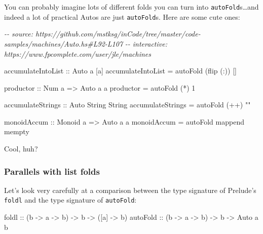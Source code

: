 \documentclass[]{article}
\newenvironment{Shaded}{}{}
\newcommand{\CommentTok}[1]{\textcolor[rgb]{0.38,0.63,0.69}{\textit{#1}}}
\newcommand{\DataTypeTok}[1]{\textcolor[rgb]{0.56,0.13,0.00}{#1}}
\newcommand{\DecValTok}[1]{\textcolor[rgb]{0.25,0.63,0.44}{#1}}
\newcommand{\FunctionTok}[1]{\textcolor[rgb]{0.02,0.16,0.49}{#1}}
\newcommand{\NormalTok}[1]{#1}
\newcommand{\OperatorTok}[1]{\textcolor[rgb]{0.40,0.40,0.40}{#1}}
\newcommand{\OtherTok}[1]{\textcolor[rgb]{0.00,0.44,0.13}{#1}}
\newcommand{\StringTok}[1]{\textcolor[rgb]{0.25,0.44,0.63}{#1}}
\begin{document}
You can probably imagine lots of different folds you can turn into
\texttt{autoFold}s\ldots and indeed a lot of practical Autos are just
\texttt{autoFold}s. Here are some cute ones:

\begin{Shaded}
\begin{Highlighting}[]
\CommentTok{{-}{-} source: https://github.com/mstksg/inCode/tree/master/code{-}samples/machines/Auto.hs\#L92{-}L107}
\CommentTok{{-}{-} interactive: https://www.fpcomplete.com/user/jle/machines}

\OtherTok{accumulateIntoList ::} \DataTypeTok{Auto}\NormalTok{ a [a]}
\NormalTok{accumulateIntoList }\OtherTok{=}\NormalTok{ autoFold (}\FunctionTok{flip}\NormalTok{ (}\OperatorTok{:}\NormalTok{)) []}

\OtherTok{productor ::} \DataTypeTok{Num}\NormalTok{ a }\OtherTok{=\textgreater{}} \DataTypeTok{Auto}\NormalTok{ a a}
\NormalTok{productor }\OtherTok{=}\NormalTok{ autoFold (}\OperatorTok{*}\NormalTok{) }\DecValTok{1}

\OtherTok{accumulateStrings ::} \DataTypeTok{Auto} \DataTypeTok{String} \DataTypeTok{String}
\NormalTok{accumulateStrings }\OtherTok{=}\NormalTok{ autoFold (}\OperatorTok{++}\NormalTok{) }\StringTok{""}

\OtherTok{monoidAccum ::} \DataTypeTok{Monoid}\NormalTok{ a }\OtherTok{=\textgreater{}} \DataTypeTok{Auto}\NormalTok{ a a}
\NormalTok{monoidAccum }\OtherTok{=}\NormalTok{ autoFold }\FunctionTok{mappend} \FunctionTok{mempty}
\end{Highlighting}
\end{Shaded}

Cool, huh?

\subsubsection{Parallels with list folds}\label{parallels-with-list-folds}

Let's look very carefully at a comparison between the type signature of
Prelude's \texttt{foldl} and the type signature of \texttt{autoFold}:

\begin{Shaded}
\begin{Highlighting}[]
\FunctionTok{foldl}\OtherTok{      ::}\NormalTok{ (b }\OtherTok{{-}\textgreater{}}\NormalTok{ a }\OtherTok{{-}\textgreater{}}\NormalTok{ b) }\OtherTok{{-}\textgreater{}}\NormalTok{ b }\OtherTok{{-}\textgreater{}}\NormalTok{ ([a] }\OtherTok{{-}\textgreater{}}\NormalTok{ b)}
\OtherTok{autoFold   ::}\NormalTok{ (b }\OtherTok{{-}\textgreater{}}\NormalTok{ a }\OtherTok{{-}\textgreater{}}\NormalTok{ b) }\OtherTok{{-}\textgreater{}}\NormalTok{ b }\OtherTok{{-}\textgreater{}}  \DataTypeTok{Auto}\NormalTok{ a b}
\end{Highlighting}
\end{Shaded}
\end{document}
